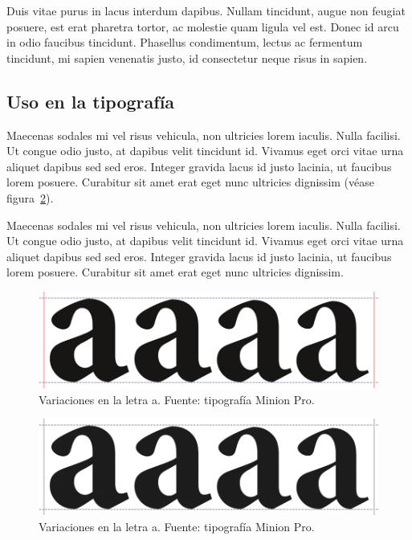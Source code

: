 Duis vitae purus in lacus interdum dapibus. Nullam tincidunt, augue non feugiat posuere, est erat pharetra tortor, ac molestie quam ligula vel est. Donec id arcu in odio faucibus tincidunt. Phasellus condimentum, lectus ac fermentum tincidunt, mi sapien venenatis justo, id consectetur neque risus in sapien.

\subsection{Uso en la tipografía}

Maecenas sodales mi vel risus vehicula, non ultricies lorem iaculis. Nulla facilisi. Ut congue odio justo, at dapibus velit tincidunt id. Vivamus eget orci vitae urna aliquet dapibus sed sed eros. Integer gravida lacus id justo lacinia, ut faucibus lorem posuere. Curabitur sit amet erat eget nunc ultricies dignissim (véase figura~\ref{figura1-1}).

Maecenas sodales mi vel risus vehicula, non ultricies lorem iaculis. Nulla facilisi. Ut congue odio justo, at dapibus velit tincidunt id. Vivamus eget orci vitae urna aliquet dapibus sed sed eros. Integer gravida lacus id justo lacinia, ut faucibus lorem posuere. Curabitur sit amet erat eget nunc ultricies dignissim.

\ifPDF
\begin{figure}[!ht]
\centering
\includegraphics[width=\textwidth]{./media/letraA.png}
\caption{Variaciones en la letra a. Fuente: tipografía Minion Pro.}\label{figura1-1}
\end{figure}
\else
\ifBNPDF
\begin{figure}[!ht]
	\centering
	\includegraphics[width=\textwidth]{./media/letraa.png}
	\caption{Variaciones en la letra a. Fuente: tipografía Minion Pro.}\label{figura1-1}
	\end{figure}
	\fi
\fi

